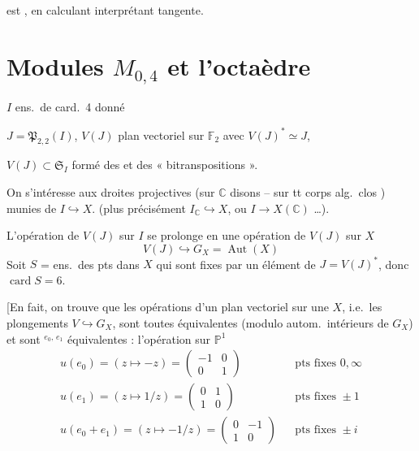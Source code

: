 \documentclass[11pt,a4paper]{article}
\begin{document}

est , en calculant  interprétant
 tangente.

\section{Modules $M_{0,4}$ et l'octaèdre}

$I$ ens.\ de card.\ 4 donné

$J = \mathfrak{P}_{2,2}(I)$, $V(J)$ plan vectoriel sur $\mathbb{F}_{2}$ avec
$V(J)^{*} \simeq J$,

$V(J) \subset \mathfrak{S}_{I}$ formé des  et des
« bitranspositions ».

On s'intéresse aux droites projectives (sur $\mathbb{C}$ disons -- \ill{} sur
tt corps alg.\ clos ) munies de $I \hookrightarrow X$.
(plus précisément $I_{\mathbb{C}} \hookrightarrow X$, ou $I \to X(\mathbb{C})$
…).

L'opération de $V(J)$ sur $I$ se prolonge en une opération de $V(J)$ sur $X$
\[
  V(J) \hookrightarrow G_{X} = \operatorname{Aut}(X)
\]
Soit $S$ = ens.\ des pts dans $X$ qui sont fixes par un élément de
$J = V(J)^{*}$, donc $\operatorname{card} S = 6$.

[En fait, on trouve que les opérations  d'un plan vectoriel
sur une $X$, i.e.\ les plongements $V \hookrightarrow G_{X}$, sont toutes
équivalentes (modulo autom.\ intérieurs de $G_{X}$) et sont 
${}^{e_{0},\, e_{1}}$ équivalentes : l'opération
sur $\mathbb{P}^{1}$
\[
\begin{array}{lll}
  u(e_{0}) = (z \mapsto -z) = \begin{pmatrix} -1 & 0 \\ 0 & 1 \end{pmatrix}
    & & \text{pts fixes } 0, \infty \\[1ex]
  u(e_{1}) = (z \mapsto 1/z) = \begin{pmatrix} 0 & 1 \\ 1 & 0 \end{pmatrix}
    & & \text{pts fixes } \pm 1 \\[1ex]
  u(e_{0}+e_{1}) = (z \mapsto -1/z) = \begin{pmatrix} 0 & -1 \\ 1 & 0 \end{pmatrix}
    & & \text{pts fixes } \pm i
\end{array}
\]
\end{document}
